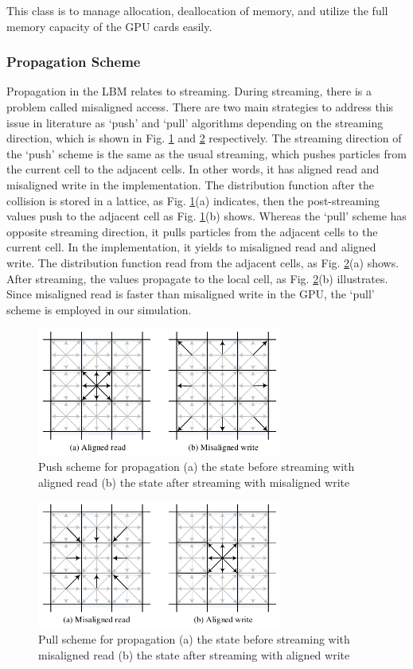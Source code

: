 \documentclass[10pt]{elsarticle}
\begin{document}
This class is to manage allocation, deallocation of memory, and utilize the full memory capacity of the GPU cards easily. 

\subsubsection{Propagation Scheme}
Propagation in the LBM relates to streaming. During streaming, there is a problem called misaligned access. There are two main strategies to address this issue in literature as ‘push’ and ‘pull’ algorithms depending on the streaming direction, which is shown in Fig. \ref{fig:PS1} and \ref{fig:PS2} respectively. The streaming direction of the ‘push’ scheme is the same as the usual streaming, which pushes particles from the current cell to the adjacent cells. In other words, it has aligned read and misaligned write in the implementation. The distribution function after the collision is stored in a lattice, as Fig. \ref{fig:PS1}(a) indicates, then the post-streaming values push to the adjacent cell as Fig. \ref{fig:PS1}(b) shows.  Whereas the ‘pull’ scheme has opposite streaming direction, it pulls particles from the adjacent cells to the current cell. In the implementation, it yields to misaligned read and aligned write. The distribution function read from the adjacent cells, as Fig. \ref{fig:PS2}(a) shows. After streaming, the values propagate to the local cell, as Fig. \ref{fig:PS2}(b) illustrates. Since misaligned read is faster than misaligned write in the GPU\cite{rf:Obrecht11}, the ‘pull’ scheme is employed in our simulation.
\begin{figure}[htpb]
\centering
\includegraphics[width=0.72\textwidth]{push.pdf}
\caption{Push scheme for propagation (a) the state before streaming with aligned read (b) the state after streaming with misaligned write}
\label{fig:PS1}
\end{figure}
\begin{figure}[t]
\centering
\includegraphics[width=0.72\textwidth]{pull.pdf}
\caption{Pull scheme for propagation (a) the state before streaming with misaligned read (b) the state after streaming with aligned write}
\label{fig:PS2}
\end{figure}
\end{document}
